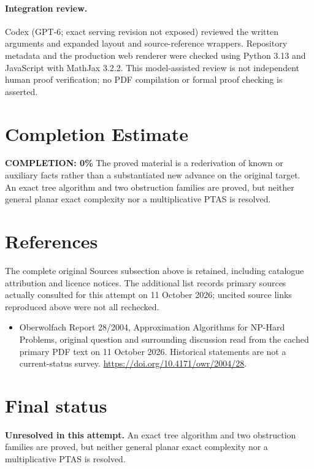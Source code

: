 \documentclass[11pt]{article}
\begin{document}
\paragraph{Integration review.} Codex (GPT-6; exact serving revision not exposed) reviewed the written arguments and expanded layout and source-reference wrappers. Repository metadata and the production web renderer were checked using Python 3.13 and JavaScript with MathJax 3.2.2. This model-assisted review is not independent human proof verification; no PDF compilation or formal proof checking is asserted.

\section{Completion Estimate}
\noindent\textbf{COMPLETION: 0\%}
The proved material is a rederivation of known or auxiliary facts rather than a substantiated new advance on the original target. An exact tree algorithm and two obstruction families are proved, but neither general planar exact complexity nor a multiplicative PTAS is resolved.
\section{References}
The complete original Sources subsection above is retained, including catalogue attribution and licence notices. The additional list records primary sources actually consulted for this attempt on 11 October 2026; uncited source links reproduced above were not all rechecked.
\begin{itemize}
\item Oberwolfach Report 28/2004, Approximation Algorithms for NP-Hard Problems, original question and surrounding discussion read from the cached primary PDF text on 11 October 2026. Historical statements are not a current-status survey. \url{https://doi.org/10.4171/owr/2004/28}.
\end{itemize}
\section{Final status}
\textbf{Unresolved in this attempt.} An exact tree algorithm and two obstruction families are proved, but neither general planar exact complexity nor a multiplicative PTAS is resolved.
\end{document}
